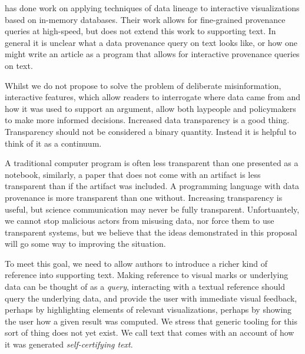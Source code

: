 \cite{psallidas18} has done work on applying techniques of data lineage to interactive
visualizations based on in-memory databases. Their work allows for fine-grained
provenance queries at high-speed, but does not extend this work to supporting text.
In general it is unclear what a data provenance query on text looks like, or how one
might write an article as a program that allows for interactive provenance queries on text.

Whilst we do not propose to solve the problem of deliberate misinformation,
interactive features, which allow readers to interrogate where data came from and how
it was used to support an argument, allow both laypeople and policymakers to make more
informed decisions. Increased data transparency is a good thing. Transparency
should not be considered a binary quantity. Instead it is helpful to think of it as a continuum.

A traditional computer program is often less transparent than one presented as a notebook,
similarly, a paper that does not come with an artifact is less transparent than if the artifact
was included. A programming language with data provenance is more transparent than one without.
Increasing transparency is useful, but science communication may never be fully transparent.
Unfortuantely, we cannot stop malicious actors from misusing data, nor force them to use transparent
systems, but we believe that the ideas demonstrated in this proposal will go some way
to improving the situation.

To meet this goal, we need to allow authors to introduce a richer kind of reference into supporting
text. Making reference to visual marks or underlying data can be thought of as a \emph{query},
interacting with a textual reference should query the underlying data, and provide the user with immediate
visual feedback, perhaps by highlighting elements of relevant visualizations, perhaps by showing the user
how a given result was computed. We stress that generic tooling for this sort of thing does not yet exist.
We call text that comes with an account of how it was generated \emph{self-certifying text}.


